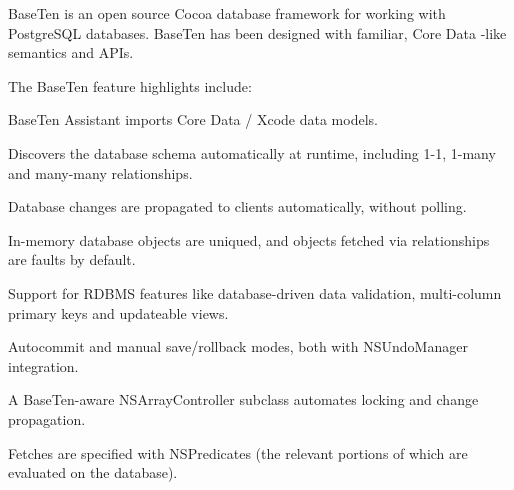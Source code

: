 Base\+Ten is an open source Cocoa database framework for working with Postgre\+S\+Q\+L databases. Base\+Ten has been designed with familiar, Core Data -\/like semantics and A\+P\+Is.

The Base\+Ten feature highlights include\+: \begin{DoxyItemize}
\item Base\+Ten Assistant imports Core Data / Xcode data models. \item Discovers the database schema automatically at runtime, including 1-\/1, 1-\/many and many-\/many relationships. \item Database changes are propagated to clients automatically, without polling. \item In-\/memory database objects are uniqued, and objects fetched via relationships are faults by default. \item Support for R\+D\+B\+M\+S features like database-\/driven data validation, multi-\/column primary keys and updateable views. \item Autocommit and manual save/rollback modes, both with N\+S\+Undo\+Manager integration. \item A Base\+Ten-\/aware N\+S\+Array\+Controller subclass automates locking and change propagation. \item Fetches are specified with N\+S\+Predicates (the relevant portions of which are evaluated on the database). \end{DoxyItemize}
